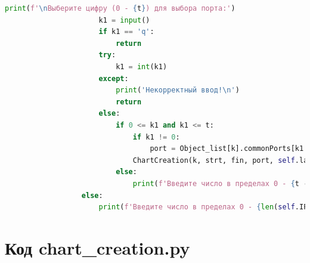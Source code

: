 \documentclass[bachelor, och, coursework]{SCWorks}
\begin{document}
\begin{lstlisting}[language=Python]
                      print(f'\nВыберите цифру (0 - {t}) для выбора порта:')
                      k1 = input()
                      if k1 == 'q':
                          return
                      try:
                          k1 = int(k1)
                      except:
                          print('Некорректный ввод!\n')
                          return
                      else:
                          if 0 <= k1 and k1 <= t:
                              if k1 != 0:
                                  port = Object_list[k].commonPorts[k1 - 1]
                              ChartCreation(k, strt, fin, port, self.labels_list).start_to_plot()
                          else:
                              print(f'Введите число в пределах 0 - {t - 1}')
                  else:
                      print(f'Введите число в пределах 0 - {len(self.IPList) - 1}')
    \end{lstlisting}

    \section{Код chart\_creation.py}
\end{document}
